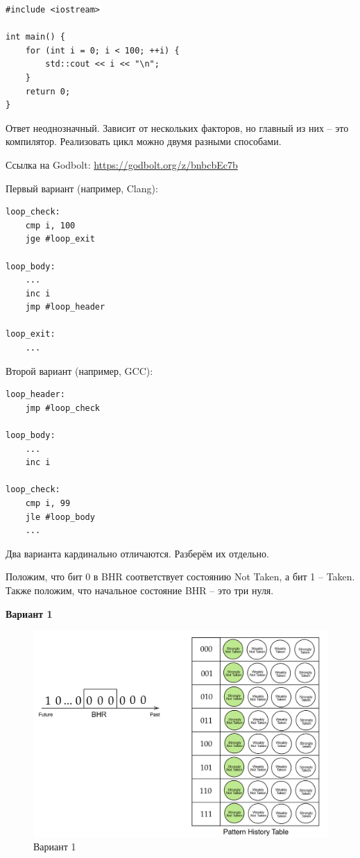 	\newpage
 	\begin{verbatim}
#include <iostream>
		
int main() {
    for (int i = 0; i < 100; ++i) {
        std::cout << i << "\n";
    }
    return 0;
}
	\end{verbatim}
	
	Ответ неоднозначный. Зависит от нескольких факторов, но главный из них -- это компилятор. Реализовать цикл можно двумя разными способами.
	
	Ссылка на Godbolt: \href{https://godbolt.org/z/bnbcbEc7b}{https://godbolt.org/z/bnbcbEc7b}

	Первый вариант (например, Clang):
	\begin{verbatim}
loop_check:
    cmp i, 100
    jge #loop_exit

loop_body:
    ...
    inc i
    jmp #loop_header

loop_exit:
    ...
	\end{verbatim}

	\newpage
	Второй вариант (например, GCC):
	\begin{verbatim}
loop_header:
    jmp #loop_check

loop_body:
    ...
    inc i

loop_check:
    cmp i, 99
    jle #loop_body
    ...
	\end{verbatim}
	
	Два варианта кардинально отличаются. Разберём их отдельно.
	
	Положим, что бит 0 в BHR соответствует состоянию Not Taken, а бит 1 -- Taken. Также положим, что начальное состояние BHR -- это три нуля.
	
	\textbf{Вариант 1}

	\begin{figure}[h!]
		\centering
		\includegraphics[width=\linewidth]{pictures/BHR_PHT_1.png}
		\caption{Вариант 1}
	\end{figure}


